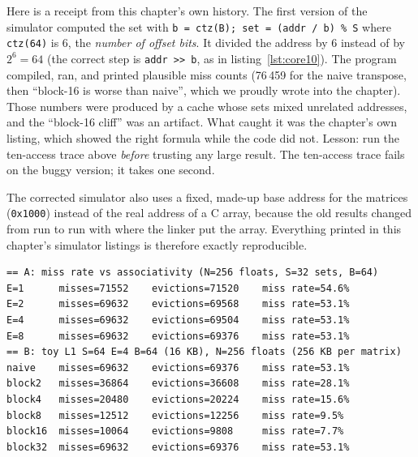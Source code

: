 \begin{example}
Here is a receipt from this chapter's own history. The first version of
the simulator computed the set with
\texttt{b = ctz(B); set = (addr / b) \% S} where \texttt{ctz(64)}
is 6, the \emph{number of offset bits}. It divided the address by 6
instead of by \(2^6=64\) (the correct step is \texttt{addr >> b}, as in
listing~\ref{lst:core10}). The program compiled, ran, and printed
plausible miss counts (76\,459 for the naive transpose, then ``block-16
is worse than naive'', which we proudly wrote into the chapter). Those
numbers were produced by a cache whose sets mixed unrelated addresses,
and the ``block-16 cliff'' was an artifact. What caught it was the
chapter's own listing, which showed the right formula while the code did
not. Lesson: run the ten-access trace above \emph{before} trusting any
large result. The ten-access trace fails on the buggy version; it takes
one second.

The corrected simulator also uses a fixed, made-up base address for the
matrices (\texttt{0x1000}) instead of the real address of a C
array, because the old results changed from run to run with where the
linker put the array. Everything printed in this chapter's simulator
listings is therefore exactly reproducible.
\end{example}

\begin{lstlisting}[language={},label={lst:sim10},caption={\texttt{./ch10\_cache\_sim}, first
two sections: miss counts of the naive transpose of a $256\times256$
float matrix across associativity (A), and naive versus blocked on the
16\,KB toy L1 (B). Exact, deterministic. Full output in
\texttt{code/ch10\_cache\_sim\_linux.txt}.}]
== A: miss rate vs associativity (N=256 floats, S=32 sets, B=64)
E=1      misses=71552    evictions=71520    miss rate=54.6%
E=2      misses=69632    evictions=69568    miss rate=53.1%
E=4      misses=69632    evictions=69504    miss rate=53.1%
E=8      misses=69632    evictions=69376    miss rate=53.1%
== B: toy L1 S=64 E=4 B=64 (16 KB), N=256 floats (256 KB per matrix)
naive    misses=69632    evictions=69376    miss rate=53.1%
block2   misses=36864    evictions=36608    miss rate=28.1%
block4   misses=20480    evictions=20224    miss rate=15.6%
block8   misses=12512    evictions=12256    miss rate=9.5%
block16  misses=10064    evictions=9808     miss rate=7.7%
block32  misses=69632    evictions=69376    miss rate=53.1%
\end{lstlisting}

